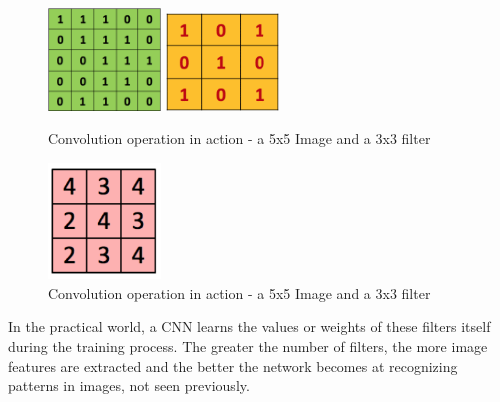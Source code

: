 \begin{figure}[h!]
\centering
\includegraphics[width=3cm]{figures/Image.png}
\hspace{4mm}
\includegraphics[width=3cm]{figures/Filter.png}
\caption{Convolution operation in action - a 5x5 Image  and a 3x3 filter}
\label{fig:cnn8}
\end{figure}

\begin{figure}[h!]
\centering
\includegraphics[width=3cm]{figures/Convolution_Result.png}
\caption{Convolution operation in action - a 5x5 Image  and a 3x3 filter}
\label{fig:cnn9}
\end{figure}

In the practical world, a CNN learns the values or weights of these filters itself during the training process. The greater the number of filters, the more image features are extracted and the better the network becomes at recognizing patterns in images, not seen previously.


